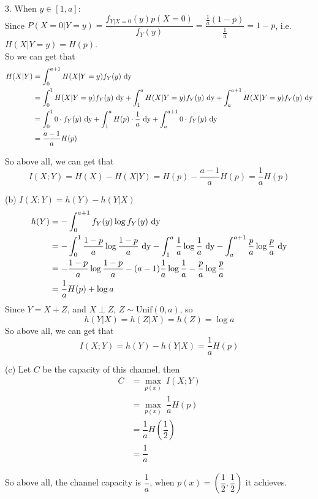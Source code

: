 3. When $y\in[1,a]$: \\
Since $P(X=0|Y=y)=\dfrac{f_{Y|X=0}(y)p(X=0)}{f_Y(y)}=\dfrac{\frac{1}{a}(1-p)}{\frac{1}{a}}=1-p$, i.e. $H(X|Y=y)=H(p)$. \\
So we can get that
\begin{align*}
H(X|Y) &= \int_{0}^{a+1}H(X|Y=y)f_Y(y){\ \text{dy}} \\
&= \int_{0}^{1}H(X|Y=y)f_Y(y){\ \text{dy}}+\int_{1}^{a}H(X|Y=y)f_Y(y){\ \text{dy}}+\int_{a}^{a+1}H(X|Y=y)f_Y(y){\ \text{dy}} \\
&= \int_{0}^{1}0\cdot f_Y(y){\ \text{dy}}+\int_{1}^{a}H(p)\cdot \dfrac{1}{a}{\ \text{dy}}+\int_{a}^{a+1}0\cdot f_Y(y){\ \text{dy}} \\
&= \dfrac{a-1}{a}H(p)
\end{align*}

So above all, we can get that
$$I(X;Y)=H(X)-H(X|Y)=H(p)-\dfrac{a-1}{a}H(p)=\dfrac{1}{a}H(p)$$

(b) $I(X;Y) = h(Y)-h(Y|X)$
\begin{align*}
h(Y) &= -\int_{0}^{a+1}f_Y(y)\log f_Y(y){\ \text{dy}} \\
&= -\int_{0}^{1}\dfrac{1-p}{a}\log\dfrac{1-p}{a}{\ \text{dy}}-\int_{1}^{a}\dfrac{1}{a}\log\dfrac{1}{a}{\ \text{dy}}-\int_{a}^{a+1}\dfrac{p}{a}\log\dfrac{p}{a}{\ \text{dy}} \\
&= -\dfrac{1-p}{a}\log\dfrac{1-p}{a}-(a-1)\dfrac{1}{a}\log\dfrac{1}{a}-\dfrac{p}{a}\log\dfrac{p}{a} \\
&= \dfrac{1}{a}H(p) + \log a
\end{align*}
Since $Y=X+Z$, and $X\perp Z$, $Z\sim\text{Unif}(0,a)$, so
$$h(Y|X)=h(Z|X)=h(Z)=\log a$$
So above all, we can get that
$$I(X;Y)=h(Y)-h(Y|X)=\dfrac{1}{a}H(p)$$

(c) Let $C$ be the capacity of this channel, then
\begin{align*}
C &= \max_{p(x)}\ I(X;Y) \\
&= \max_{p(x)}\ \dfrac{1}{a}H(p) \\
&= \dfrac{1}{a}H\left(\dfrac{1}{2}\right) \\
&= \dfrac{1}{a}
\end{align*}

So above all, the channel capacity is $\dfrac{1}{a}$, when $p(x)=\left(\dfrac{1}{2},\dfrac{1}{2}\right)$ it achieves.